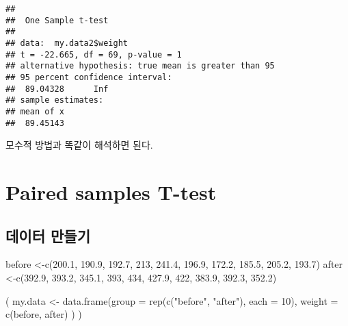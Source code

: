 \documentclass[
]{article}
\newenvironment{Shaded}{\begin{snugshade}}{\end{snugshade}}
\newcommand{\AttributeTok}[1]{\textcolor[rgb]{0.77,0.63,0.00}{#1}}
\newcommand{\DecValTok}[1]{\textcolor[rgb]{0.00,0.00,0.81}{#1}}
\newcommand{\FloatTok}[1]{\textcolor[rgb]{0.00,0.00,0.81}{#1}}
\newcommand{\FunctionTok}[1]{\textcolor[rgb]{0.00,0.00,0.00}{#1}}
\newcommand{\NormalTok}[1]{#1}
\newcommand{\OtherTok}[1]{\textcolor[rgb]{0.56,0.35,0.01}{#1}}
\newcommand{\SpecialCharTok}[1]{\textcolor[rgb]{0.00,0.00,0.00}{#1}}
\newcommand{\StringTok}[1]{\textcolor[rgb]{0.31,0.60,0.02}{#1}}
\begin{document}
\begin{Shaded}
\end{Shaded}

\begin{verbatim}
## 
##  One Sample t-test
## 
## data:  my.data2$weight
## t = -22.665, df = 69, p-value = 1
## alternative hypothesis: true mean is greater than 95
## 95 percent confidence interval:
##  89.04328      Inf
## sample estimates:
## mean of x 
##  89.45143
\end{verbatim}

모수적 방법과 똑같이 해석하면 된다.

\hypertarget{paired-samples-t-test}{%
\section{Paired samples T-test}\label{paired-samples-t-test}}

\hypertarget{uxb370uxc774uxd130-uxb9ccuxb4e4uxae30-1}{%
\subsection{데이터 만들기}\label{uxb370uxc774uxd130-uxb9ccuxb4e4uxae30-1}}

\begin{Shaded}
\begin{Highlighting}[]
\NormalTok{before }\OtherTok{\textless{}{-}}\FunctionTok{c}\NormalTok{(}\FloatTok{200.1}\NormalTok{, }\FloatTok{190.9}\NormalTok{, }\FloatTok{192.7}\NormalTok{, }\DecValTok{213}\NormalTok{, }\FloatTok{241.4}\NormalTok{, }\FloatTok{196.9}\NormalTok{, }\FloatTok{172.2}\NormalTok{, }\FloatTok{185.5}\NormalTok{, }\FloatTok{205.2}\NormalTok{, }\FloatTok{193.7}\NormalTok{)}
\NormalTok{after }\OtherTok{\textless{}{-}}\FunctionTok{c}\NormalTok{(}\FloatTok{392.9}\NormalTok{, }\FloatTok{393.2}\NormalTok{, }\FloatTok{345.1}\NormalTok{, }\DecValTok{393}\NormalTok{, }\DecValTok{434}\NormalTok{, }\FloatTok{427.9}\NormalTok{, }\DecValTok{422}\NormalTok{, }\FloatTok{383.9}\NormalTok{, }\FloatTok{392.3}\NormalTok{, }\FloatTok{352.2}\NormalTok{)    }

\NormalTok{( my.data }\OtherTok{\textless{}{-}} \FunctionTok{data.frame}\NormalTok{(}\AttributeTok{group =} \FunctionTok{rep}\NormalTok{(}\FunctionTok{c}\NormalTok{(}\StringTok{"before"}\NormalTok{, }\StringTok{"after"}\NormalTok{), }\AttributeTok{each =} \DecValTok{10}\NormalTok{), }\AttributeTok{weight =} \FunctionTok{c}\NormalTok{(before, after) ) )}
\end{Highlighting}
\end{Shaded}
\end{document}
